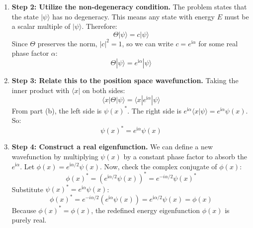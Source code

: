 \begin{solution}
\begin{enumerate}
    \item \textbf{Step 2: Utilize the non-degeneracy condition.}
    The problem states that the state $|\psi\rangle$ has no degeneracy. This means any state with energy $E$ must be a scalar multiple of $|\psi\rangle$. Therefore:
    \[ \Theta|\psi\rangle = c|\psi\rangle \]
    Since $\Theta$ preserves the norm, $|c|^2 = 1$, so we can write $c = e^{\mathrm{i} \alpha}$ for some real phase factor $\alpha$:
    \[ \Theta|\psi\rangle = e^{\mathrm{i} \alpha} |\psi\rangle \]
    
    \item \textbf{Step 3: Relate this to the position space wavefunction.}
    Taking the inner product with $\langle x |$ on both sides:
    \[ \langle x | \Theta | \psi \rangle = \langle x | e^{\mathrm{i} \alpha} | \psi \rangle \]
    From part (b), the left side is $\psi(x)^*$. The right side is $e^{\mathrm{i} \alpha} \langle x | \psi \rangle = e^{\mathrm{i} \alpha} \psi(x)$. So:
    \[ \psi(x)^* = e^{\mathrm{i} \alpha} \psi(x) \]
    
    \item \textbf{Step 4: Construct a real eigenfunction.}
    We can define a new wavefunction by multiplying $\psi(x)$ by a constant phase factor to absorb the $e^{\mathrm{i} \alpha}$. Let $\phi(x) = e^{\mathrm{i} \alpha/2} \psi(x)$.
    Now, check the complex conjugate of $\phi(x)$:
    \[ \phi(x)^* = (e^{\mathrm{i} \alpha/2} \psi(x))^* = e^{-i\alpha/2} \psi(x)^* \]
    Substitute $\psi(x)^* = e^{\mathrm{i} \alpha} \psi(x)$:
    \[ \phi(x)^* = e^{-i\alpha/2} (e^{\mathrm{i} \alpha} \psi(x)) = e^{\mathrm{i} \alpha/2} \psi(x) = \phi(x) \]
    Because $\phi(x)^* = \phi(x)$, the redefined energy eigenfunction $\phi(x)$ is purely real.
\end{enumerate}
\end{solution}

